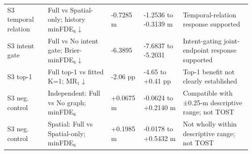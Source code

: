 \begin{tabular}{lllll}
S3 temporal relation & Full vs Spatial-only; history minFDE₆ ↓ & -0.7285 m & -1.2536 to -0.3139 m & Temporal-relation response supported \\
S3 intent gate & Full vs No intent gate; Brier-minFDE₆ ↓ & -6.3895 & -7.6837 to -5.2031 & Intent-gating joint-endpoint response supported \\
S3 top-1 & Full top-1 vs fitted K=1; MR₁ ↓ & -2.06 pp & -4.65 to +0.41 pp & Top-1 benefit not clearly established \\
S3 neg. control & Independent: Full vs No graph; minFDE₆ & +0.0675 m & -0.0624 to +0.2140 m & Compatible with ±0.25-m descriptive range; not TOST \\
S3 neg. control & Spatial: Full vs Spatial-only; minFDE₆ & +0.1985 m & -0.0178 to +0.5432 m & Not wholly within descriptive range; not TOST \\
\hline
\end{tabular}
